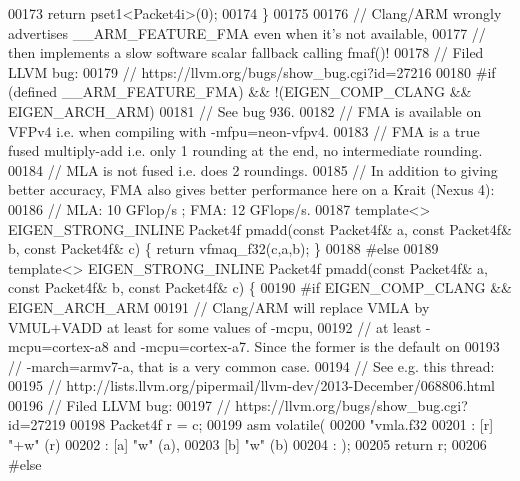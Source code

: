 \begin{DoxyCode}
{00173   \textcolor{keywordflow}{return} pset1<Packet4i>(0);
00174 \}
00175 
00176 \textcolor{comment}{// Clang/ARM wrongly advertises \_\_ARM\_FEATURE\_FMA even when it's not available,}
00177 \textcolor{comment}{// then implements a slow software scalar fallback calling fmaf()!}
00178 \textcolor{comment}{// Filed LLVM bug:}
00179 \textcolor{comment}{//     https://llvm.org/bugs/show\_bug.cgi?id=27216}
00180 \textcolor{preprocessor}{#if (defined \_\_ARM\_FEATURE\_FMA) && !(EIGEN\_COMP\_CLANG && EIGEN\_ARCH\_ARM)}
00181 \textcolor{comment}{// See bug 936.}
00182 \textcolor{comment}{// FMA is available on VFPv4 i.e. when compiling with -mfpu=neon-vfpv4.}
00183 \textcolor{comment}{// FMA is a true fused multiply-add i.e. only 1 rounding at the end, no intermediate rounding.}
00184 \textcolor{comment}{// MLA is not fused i.e. does 2 roundings.}
00185 \textcolor{comment}{// In addition to giving better accuracy, FMA also gives better performance here on a Krait (Nexus 4):}
00186 \textcolor{comment}{// MLA: 10 GFlop/s ; FMA: 12 GFlops/s.}
00187 \textcolor{keyword}{template}<> EIGEN\_STRONG\_INLINE Packet4f pmadd(\textcolor{keyword}{const} Packet4f& a, \textcolor{keyword}{const} Packet4f& b, \textcolor{keyword}{const} Packet4f& c) \{ \textcolor{keywordflow}{
      return} vfmaq\_f32(c,a,b); \}
00188 \textcolor{preprocessor}{#else}
00189 \textcolor{keyword}{template}<> EIGEN\_STRONG\_INLINE Packet4f pmadd(\textcolor{keyword}{const} Packet4f& a, \textcolor{keyword}{const} Packet4f& b, \textcolor{keyword}{const} Packet4f& c) \{
00190 \textcolor{preprocessor}{#if EIGEN\_COMP\_CLANG && EIGEN\_ARCH\_ARM}
00191   \textcolor{comment}{// Clang/ARM will replace VMLA by VMUL+VADD at least for some values of -mcpu,}
00192   \textcolor{comment}{// at least -mcpu=cortex-a8 and -mcpu=cortex-a7. Since the former is the default on}
00193   \textcolor{comment}{// -march=armv7-a, that is a very common case.}
00194   \textcolor{comment}{// See e.g. this thread:}
00195   \textcolor{comment}{//     http://lists.llvm.org/pipermail/llvm-dev/2013-December/068806.html}
00196   \textcolor{comment}{// Filed LLVM bug:}
00197   \textcolor{comment}{//     https://llvm.org/bugs/show\_bug.cgi?id=27219}
00198   Packet4f r = c;
00199   \textcolor{keyword}{asm} \textcolor{keyword}{volatile}(
00200     \textcolor{stringliteral}{"vmla.f32 %
00201     : [r] \textcolor{stringliteral}{"+w"} (r)
00202     : [a] \textcolor{stringliteral}{"w"} (a),
00203       [b] \textcolor{stringliteral}{"w"} (b)
00204     : );
00205   \textcolor{keywordflow}{return} r;
00206 \textcolor{preprocessor}{#else}
}}
\end{DoxyCode}
